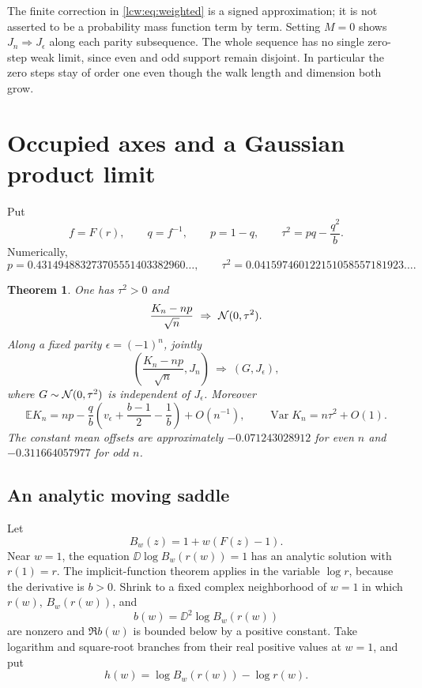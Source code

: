 \documentclass[11pt,letterpaper]{article}
\newtheorem{theorem}{Theorem}[section]
\theoremstyle{remark}\newtheorem{remark}[theorem]{Remark}
\newcommand{\E}{\mathbb E}\newcommand{\Pp}{\mathbb P}
\newcommand{\Var}{\operatorname{Var}}\newcommand{\Cov}{\operatorname{Cov}}
\begin{document}
The finite correction in \eqref{lcw:eq:weighted} is a signed approximation; it is not asserted to be a probability mass function term by term. Setting $M=0$ shows $J_n\Rightarrow J_\epsilon$ along each parity subsequence. The whole sequence has no single zero-step weak limit, since even and odd support remain disjoint. In particular the zero steps stay of order one even though the walk length and dimension both grow.

\section{Occupied axes and a Gaussian product limit}\label{lcw:sec:occupation}
Put
\begin{equation}\label{lcw:eq:occupation-constants}
 f=F(r),\qquad q=f^{-1},\qquad p=1-q,\qquad
 \tau^2=pq-\frac{q^2}{b}.
\end{equation}
Numerically,
\[
 p=0.431494883273705551403382960\ldots,\qquad
 \tau^2=0.041597460122151058557181923\ldots.
\]

\begin{theorem}\label{lcw:thm:occupation}
One has $\tau^2>0$ and
\begin{equation}\label{lcw:eq:occupation-clt}
 \frac{K_n-np}{\sqrt n}\ \Rightarrow\ \mathcal N(0,\tau^2).
\end{equation}
Along a fixed parity $\epsilon=(-1)^n$, jointly
\begin{equation}\label{lcw:eq:product}
 \left(\frac{K_n-np}{\sqrt n},J_n\right)
 \ \Rightarrow\ (G,J_\epsilon),
\end{equation}
where $G\sim\mathcal N(0,\tau^2)$ is independent of $J_\epsilon$. Moreover
\begin{equation}\label{lcw:eq:meanoffset}
 \E K_n=np-\frac qb\left(v_\epsilon+\frac{b-1}{2}-\frac1b\right)
 +O(n^{-1}),\qquad \Var K_n=n\tau^2+O(1).
\end{equation}
The constant mean offsets are approximately $-0.071243028912$ for even $n$ and $-0.311664057977$ for odd $n$.
\end{theorem}

\subsection{An analytic moving saddle}
Let
\[
 B_w(z)=1+w(F(z)-1).
\]
Near $w=1$, the equation $\DD\log B_w(r(w))=1$ has an analytic solution with $r(1)=r$. The implicit-function theorem applies in the variable $\log r$, because the derivative is $b>0$. Shrink to a fixed complex neighborhood of $w=1$ in which $r(w)$, $B_w(r(w))$, and
\[
 b(w)=\DD^2\log B_w(r(w))
\]
are nonzero and $\Re b(w)$ is bounded below by a positive constant. Take logarithm and square-root branches from their real positive values at $w=1$, and put
\begin{equation}\label{lcw:eq:h}
 h(w)=\log B_w(r(w))-\log r(w).
\end{equation}
\end{document}
